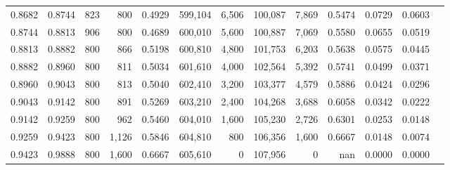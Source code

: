 \begin{tabular}{rrrrrrrrrrrrr}
0.8682 & 0.8744 &    823 &   800 &                                     0.4929 & 599,104 &   6,506 & 100,087 &   7,869 & 0.5474 & 0.0729 & 0.0603 \\
0.8744 & 0.8813 &    906 &   800 &                                     0.4689 & 600,010 &   5,600 & 100,887 &   7,069 & 0.5580 & 0.0655 & 0.0519 \\
0.8813 & 0.8882 &    800 &   866 &                                     0.5198 & 600,810 &   4,800 & 101,753 &   6,203 & 0.5638 & 0.0575 & 0.0445 \\
0.8882 & 0.8960 &    800 &   811 &                                     0.5034 & 601,610 &   4,000 & 102,564 &   5,392 & 0.5741 & 0.0499 & 0.0371 \\
0.8960 & 0.9043 &    800 &   813 &                                     0.5040 & 602,410 &   3,200 & 103,377 &   4,579 & 0.5886 & 0.0424 & 0.0296 \\
0.9043 & 0.9142 &    800 &   891 &                                     0.5269 & 603,210 &   2,400 & 104,268 &   3,688 & 0.6058 & 0.0342 & 0.0222 \\
0.9142 & 0.9259 &    800 &   962 &                                     0.5460 & 604,010 &   1,600 & 105,230 &   2,726 & 0.6301 & 0.0253 & 0.0148 \\
0.9259 & 0.9423 &    800 & 1,126 &                                     0.5846 & 604,810 &     800 & 106,356 &   1,600 & 0.6667 & 0.0148 & 0.0074 \\
0.9423 & 0.9888 &    800 & 1,600 &                                     0.6667 & 605,610 &       0 & 107,956 &       0 &    nan & 0.0000 & 0.0000 \\
\bottomrule
\end{tabular}
